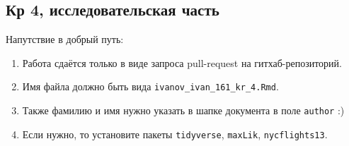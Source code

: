




\subsection{Кр 4, исследовательская часть}

Напутствие в добрый путь:

\begin{enumerate}
\item Работа сдаётся только в виде запроса pull-request на гитхаб-репозиторий.

\item Имя файла должно быть вида \verb|ivanov_ivan_161_kr_4.Rmd|.

\item Также фамилию и имя нужно указать в шапке документа в поле \verb|author| :)

\item Если нужно, то установите пакеты \verb|tidyverse|, \verb|maxLik|, \verb|nycflights13|.
\end{enumerate}



